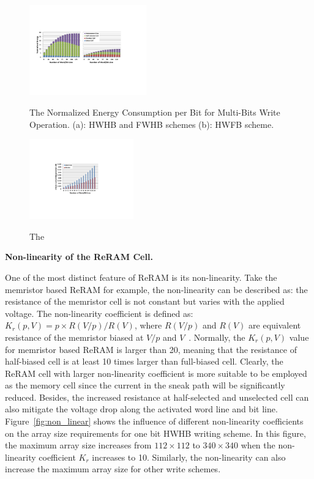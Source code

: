 \begin{figure}%
\centering
  \includegraphics[width=0.45\textwidth]{./figures/multi_energy2.pdf}\\
  \caption{The Normalized Energy Consumption per Bit for Multi-Bits Write Operation. (a): HWHB and  FWHB schemes (b): HWFB scheme. }\label{fig:multi_energy}
\end{figure}


\begin{figure}%
\centering
  \includegraphics[width=0.4\textwidth]{./figures/multi_I2.pdf}\\
  \caption{The }\label{fig:multi_I}
\end{figure}

\vspace{6pt} \textbf{Non-linearity of the ReRAM Cell.} \vspace{6pt}

One of the most distinct feature of ReRAM is its non-linearity. Take the memristor based ReRAM for example, the non-linearity can be described as: the resistance of the memristor cell is not constant but varies with the applied voltage. The non-linearity coefficient is defined as:
$K_r(p,V) = p \times R(V/p)/R(V)$, where $R(V/p)$ and $R(V)$ are equivalent resistance of the memristor biased at $V/p$ and $V$~\cite{memristor:Cong}. Normally, the $K_r(p,V)$ value for memristor based ReRAM is larger than 20, meaning that the resistance of half-biased  cell is at least 10 times larger than full-biased cell. Clearly, the ReRAM cell with larger non-linearity coefficient is more suitable to be employed as the memory cell since the current in the sneak path will be significantly reduced. Besides, the increased resistance at half-selected and unselected cell can also mitigate the voltage drop along the activated word line and bit line. Figure~\ref{fig:non_linear} shows the influence of different non-linearity coefficients on the array size requirements for one bit HWHB writing scheme. In this figure, the maximum array size increases from $112 \times 112$ to $340 \times 340$ when the non-linearity coefficient $K_r$ increases to 10. Similarly, the non-linearity can also increase the maximum array size for other write schemes.

